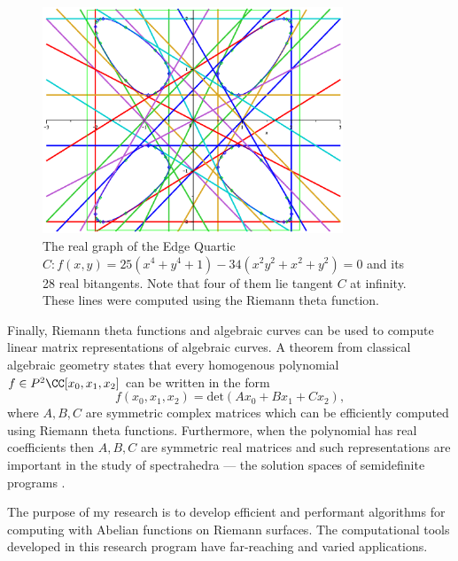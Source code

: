 \begin{figure}[t]
  \centering
  \includegraphics[width=0.8\textwidth]{images/edgequartic}
  \caption{The real graph of the Edge Quartic $C: f(x,y) = 25(x^4+y^4+1)
    - 34(x^2y^2+x^2+y^2) = 0$ and its 28 real bitangents. Note that four
    of them lie tangent $C$ at infinity. These lines were computed using
    the Riemann theta function.}
  \label{fig: edge}
\end{figure}

Finally, Riemann theta functions and algebraic curves can be used to
compute linear matrix representations of algebraic curves. A theorem
from classical algebraic geometry states that every homogenous
polynomial $f \in P^2\CC[x_0,x_1,x_2]$ can be written in the form
\[
   f(x_0,x_1,x_2) = \text{det}
   \left( A x_0 + B x_1 + C x_2 \right),
\]
where $A,B,C$ are symmetric complex matrices which can be efficiently
computed using Riemann theta functions. Furthermore, when the polynomial
has real coefficients then $A,B,C$ are symmetric real matrices and such
representations are important in the study of spectrahedra --- the
solution spaces of semidefinite programs \cite{PSV10}.

The purpose of my research is to develop efficient and performant
algorithms for computing with Abelian functions on Riemann surfaces. The
computational tools developed in this research program have far-reaching
and varied applications.

